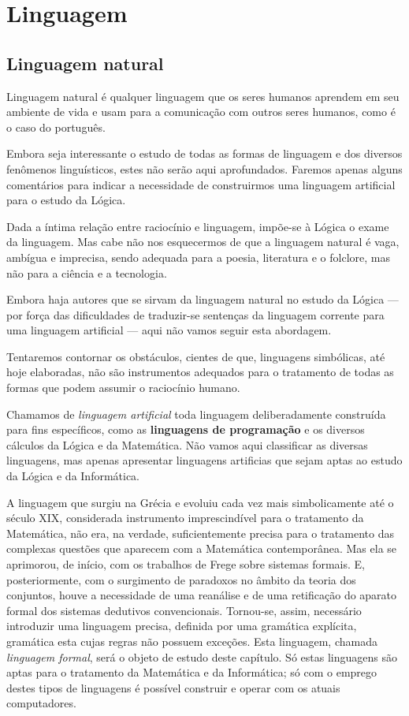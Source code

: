 
\chapter{Linguagem}
\section{Linguagem natural}

Linguagem natural é qualquer linguagem que os seres humanos aprendem em seu
ambiente de vida e usam para a comunicação com outros seres humanos, como é o
caso do português.

Embora seja interessante o estudo de todas as formas de linguagem e dos diversos
fenômenos linguísticos, estes não serão aqui aprofundados. Faremos apenas alguns
comentários para indicar a necessidade de construirmos uma linguagem artificial
para o estudo da Lógica.

Dada a íntima relação entre raciocínio e linguagem, impõe-se à Lógica o exame da linguagem.
Mas cabe não nos esquecermos de que a linguagem natural é vaga, ambígua e imprecisa, sendo adequada para a poesia, literatura e o folclore, mas não para a ciência e a tecnologia.

Embora haja autores que se sirvam da linguagem natural no estudo da Lógica --- por força das dificuldades de traduzir-se sentenças da linguagem corrente para uma linguagem artificial --- aqui não vamos seguir esta abordagem.

Tentaremos contornar os obstáculos, cientes de que, linguagens simbólicas, até hoje elaboradas, não são instrumentos adequados para o tratamento de todas as formas que podem assumir o raciocínio humano.

\newpage

Chamamos de \emph{linguagem artificial} %
toda linguagem deliberadamente construída para fins específicos, como as \textbf{linguagens de programação} e os diversos cálculos da Lógica e da Matemática.
Não vamos aqui classificar as diversas linguagens, mas apenas apresentar linguagens artificias que sejam aptas ao estudo da Lógica e da Informática.

A linguagem que surgiu na Grécia e evoluiu cada vez mais simbolicamente até o século XIX, considerada instrumento imprescindível para o tratamento da Matemática, não era, na verdade, suficientemente precisa para o tratamento das complexas questões que aparecem com a Matemática contemporânea.
Mas ela se aprimorou, de início, com os trabalhos de Frege sobre sistemas formais.
E, posteriormente, com o surgimento de paradoxos no âmbito da teoria dos conjuntos, houve a necessidade de uma reanálise e de uma retificação do aparato formal dos sistemas dedutivos convencionais.
Tornou-se, assim, necessário introduzir uma linguagem precisa, definida por uma gramática explícita, gramática esta cujas regras não possuem exceções. Esta linguagem, chamada \emph{linguagem formal}, %
será o objeto de estudo deste capítulo.
Só estas linguagens são aptas para o tratamento da Matemática e da Informática;
só com o emprego destes tipos de linguagens é possível construir e operar com os atuais computadores.

